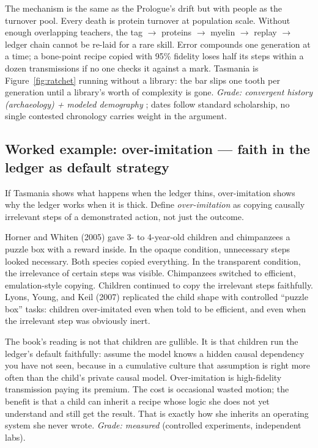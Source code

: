 The mechanism is the same as the Prologue's drift but with people as the turnover pool. Every death is protein turnover at population scale. Without enough overlapping teachers, the tag $\to$ proteins $\to$ myelin $\to$ replay $\to$ ledger chain cannot be re-laid for a rare skill. Error compounds one generation at a time; a bone-point recipe copied with 95\% fidelity loses half its steps within a dozen transmissions if no one checks it against a mark. Tasmania is Figure~\ref{fig:ratchet} running without a library: the bar slips one tooth per generation until a library's worth of complexity is gone. \textit{Grade: convergent history (archaeology) + modeled demography} \citep{henrich}; dates follow standard scholarship, no single contested chronology carries weight in the argument.

\subsection*{Worked example: over-imitation --- faith in the ledger as default strategy}

If Tasmania shows what happens when the ledger thins, over-imitation shows why the ledger works when it is thick. Define \textit{over-imitation} as copying causally irrelevant steps of a demonstrated action, not just the outcome.

Horner and Whiten (2005) gave 3- to 4-year-old children and chimpanzees a puzzle box with a reward inside. In the opaque condition, unnecessary steps looked necessary. Both species copied everything. In the transparent condition, the irrelevance of certain steps was visible. Chimpanzees switched to efficient, emulation-style copying. Children continued to copy the irrelevant steps faithfully. Lyons, Young, and Keil (2007) replicated the child shape with controlled ``puzzle box'' tasks: children over-imitated even when told to be efficient, and even when the irrelevant step was obviously inert.

The book's reading is not that children are gullible. It is that children run the ledger's default faithfully: assume the model knows a hidden causal dependency you have not seen, because in a cumulative culture that assumption is right more often than the child's private causal model. Over-imitation is high-fidelity transmission paying its premium. The cost is occasional wasted motion; the benefit is that a child can inherit a recipe whose logic she does not yet understand and still get the result. That is exactly how she inherits an operating system she never wrote. \textit{Grade: measured} (controlled experiments, independent labs).

